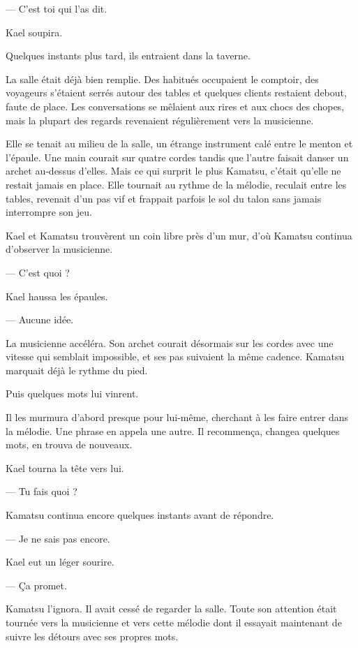 — C'est toi qui l'as dit.

Kael soupira.

Quelques instants plus tard, ils entraient dans la taverne.

\scenebreak

La salle était déjà bien remplie. Des habitués occupaient le comptoir, des
voyageurs s'étaient serrés autour des tables et quelques clients restaient
debout, faute de place. Les conversations se mêlaient aux rires et aux chocs
des chopes, mais la plupart des regards revenaient régulièrement vers la
musicienne.

Elle se tenait au milieu de la salle, un étrange instrument calé entre le
menton et l'épaule. Une main courait sur quatre cordes tandis que l'autre
faisait danser un archet au-dessus d'elles. Mais ce qui surprit le plus
Kamatsu, c'était qu'elle ne restait jamais en place. Elle tournait au rythme
de la mélodie, reculait entre les tables, revenait d'un pas vif et frappait
parfois le sol du talon sans jamais interrompre son jeu.

Kael et Kamatsu trouvèrent un coin libre près d'un mur, d'où Kamatsu continua
d'observer la musicienne.

— C'est quoi ?

Kael haussa les épaules.

— Aucune idée.

La musicienne accéléra. Son archet courait désormais sur les cordes avec une
vitesse qui semblait impossible, et ses pas suivaient la même cadence.
Kamatsu marquait déjà le rythme du pied.

Puis quelques mots lui vinrent.

Il les murmura d'abord presque pour lui-même, cherchant à les faire entrer
dans la mélodie. Une phrase en appela une autre. Il recommença, changea
quelques mots, en trouva de nouveaux.

Kael tourna la tête vers lui.

— Tu fais quoi ?

Kamatsu continua encore quelques instants avant de répondre.

— Je ne sais pas encore.

Kael eut un léger sourire.

— Ça promet.

Kamatsu l'ignora. Il avait cessé de regarder la salle. Toute son attention
était tournée vers la musicienne et vers cette mélodie dont il essayait
maintenant de suivre les détours avec ses propres mots.

